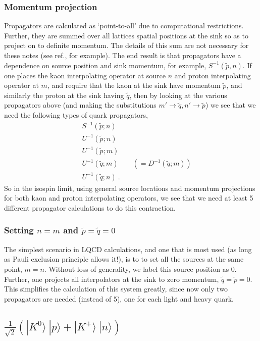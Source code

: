 \documentclass[%
 preprint,
nofootinbib,
 amsmath,amssymb,
 aps,
]{revtex4-2}
\begin{document}
\subsubsection{Momentum projection}
Propagators are calculated as `point-to-all' due to computational restrictions.  Further, they are summed over all lattices spatial positions at the sink so as to project on to definite momentum.  The details of this sum are not necessary for these notes (see ref.\cite{Gattringer:2010zz}, for example).  The end result is that propagators have a dependence on source position and sink momentum, for example, $S^{-1}(\tilde{p},n)$.  If one places the kaon interpolating operator at source $n$ and proton interpolating operator at $m$, and require that the kaon at the sink have momentum $\tilde{p}$, and similarly the proton at the sink having $\tilde{q}$, then by looking at the various propagators above (and making the substitutions $m'\rightarrow \tilde{q}, n'\rightarrow\tilde{p}$) we see that we need the following types of quark propagators,
\begin{eqnarray*}
&&S^{-1}(\tilde{p};n)\\
&&U^{-1}(\tilde{p};n)\\
&&U^{-1}(\tilde{p};m)\\
&&U^{-1}(\tilde{q};m)\quad\quad \left(=D^{-1}(\tilde{q};m)\right)\\
&&U^{-1}(\tilde{q};n)\ .
\end{eqnarray*}
So in the isospin limit, using general source locations and momentum projections for both kaon and proton interpolating operators, we see that we need at least 5 different propagator calculations to do this contraction.

\subsubsection{Setting $n=m$ and $\tilde{p}=\tilde{q}=0$}
The simplest scenario in LQCD calculations, and one that is most used (as long as Pauli exclusion principle allows it!), is to to set all the sources at the same point, $m=n$.  Without loss of generality, we label this source position as $0$.  Further, one projects all interpolators at the sink to zero momentum, $\tilde{q}=\tilde{p}=0$.  This simplifies the calculation of this system greatly, since now only two propagators are needed (instead of 5), one for each light and heavy quark.  

\subsection{$\frac{1}{\sqrt{2}}\left(|K^0\rangle\ |p\rangle + |K^+\rangle\ |n\rangle \right)$}
\end{document}
